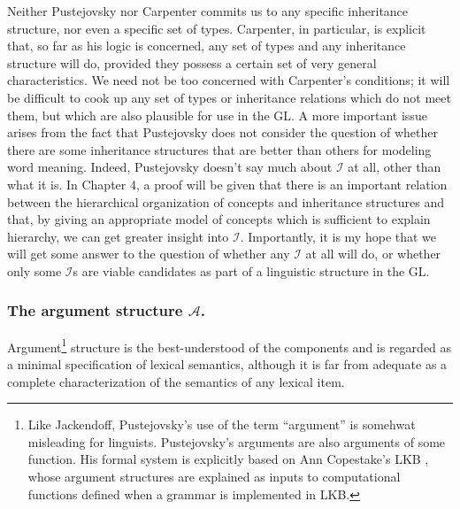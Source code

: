 Neither Pustejovsky nor Carpenter commits us to any specific inheritance structure, nor even a specific set of types. Carpenter, in particular, is explicit that, so far as his logic is concerned, any set of types and any inheritance structure will do, provided they possess a certain set of very general characteristics. We need not be too concerned with Carpenter's conditions; it will be difficult to cook up any set of types or inheritance relations which do not meet them, but which are also plausible for use in the GL. A more important issue arises from the fact that Pustejovsky does not consider the question of whether there are some inheritance structures that are better than others for modeling word meaning. Indeed, Pustejovsky doesn't say much about $\mathcal{I}$ at all, other than what it is. In Chapter 4, a proof will be given that there is an important relation between the hierarchical organization of concepts and inheritance structures and that, by giving an appropriate model of concepts which is sufficient to explain hierarchy, we can get greater insight into $\mathcal{I}$. Importantly, it is my hope that we will get some answer to the question of whether any $\mathcal{I}$ at all will do, or whether only some $\mathcal{I}$s are viable candidates as part of a linguistic structure in the GL.

\subsubsection{The argument structure $\mathcal{A}$.}

Argument\footnote{Like Jackendoff, Pustejovsky's use of the term ``argument'' is somehwat misleading for linguists. Pustejovsky's arguments are also arguments of some function. His formal system is explicitly based on Ann Copestake's LKB \cite{copestake_implementing_2002}, whose argument structures are explained as inputs to computational functions defined when a grammar is implemented in LKB.} structure is the best-understood of the components and is regarded as a minimal specification of lexical semantics, although it is far from adequate as a complete characterization of the semantics of any lexical item.

